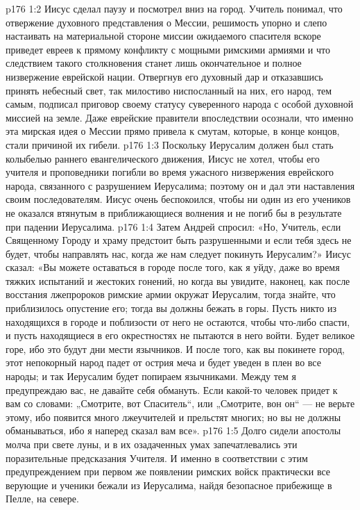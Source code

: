 \vs p176 1:2 Иисус сделал паузу и посмотрел вниз на город. Учитель понимал, что отвержение духовного представления о Мессии, решимость упорно и слепо настаивать на материальной стороне миссии ожидаемого спасителя вскоре приведет евреев к прямому конфликту с мощными римскими армиями и что следствием такого столкновения станет лишь окончательное и полное низвержение еврейской нации. Отвергнув его духовный дар и отказавшись принять небесный свет, так милостиво ниспосланный на них, его народ, тем самым, подписал приговор своему статусу суверенного народа с особой духовной миссией на земле. Даже еврейские правители впоследствии осознали, что именно эта мирская идея о Мессии прямо привела к смутам, которые, в конце концов, стали причиной их гибели.
\vs p176 1:3 Поскольку Иерусалим должен был стать колыбелью раннего евангелического движения, Иисус не хотел, чтобы его учителя и проповедники погибли во время ужасного низвержения еврейского народа, связанного с разрушением Иерусалима; поэтому он и дал эти наставления своим последователям. Иисус очень беспокоился, чтобы ни один из его учеников не оказался втянутым в приближающиеся волнения и не погиб бы в результате при падении Иерусалима.
\vs p176 1:4 Затем Андрей спросил: «Но, Учитель, если Священному Городу и храму предстоит быть разрушенными и если тебя здесь не будет, чтобы направлять нас, когда же нам следует покинуть Иерусалим?» Иисус сказал: «Вы можете оставаться в городе после того, как я уйду, даже во время тяжких испытаний и жестоких гонений, но когда вы увидите, наконец, как после восстания лжепророков римские армии окружат Иерусалим, тогда знайте, что приблизилось опустение его; тогда вы должны бежать в горы. Пусть никто из находящихся в городе и поблизости от него не остаются, чтобы что\hyp{}либо спасти, и пусть находящиеся в его окрестностях не пытаются в него войти. Будет великое горе, ибо это будут дни мести язычников. И после того, как вы покинете город, этот непокорный народ падет от острия меча и будет уведен в плен во все народы; и так Иерусалим будет попираем язычниками. Между тем я предупреждаю вас, не давайте себя обмануть. Если какой\hyp{}то человек придет к вам со словами: „Смотрите, вот Спаситель“, или „Смотрите, вон он“ --- не верьте этому, ибо появится много лжеучителей и прельстят многих; но вы не должны обманываться, ибо я наперед сказал вам все».
\vs p176 1:5 Долго сидели апостолы молча при свете луны, и в их озадаченных умах запечатлевались эти поразительные предсказания Учителя. И именно в соответствии с этим предупреждением при первом же появлении римских войск практически все верующие и ученики бежали из Иерусалима, найдя безопасное прибежище в Пелле, на севере.
